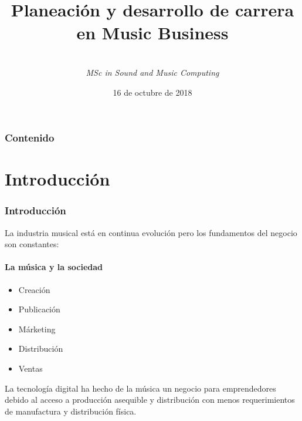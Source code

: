 \documentclass[xcolor=table]{beamer}
\title[Planeación y desarrollo de carrera en Music Business]{Planeación y desarrollo de carrera en Music Business} %
\author%
{%
    \sc{Paulo Chiliguano}\\
    \textit{MSc in Sound and Music Computing}
}
\institute%
{%
    \textit{Queen Mary University of London}
}
\date[Octubre 2018]{16 de octubre de 2018} %
\begin{document}
	\begin{frame}[plain]
		\titlepage
	\end{frame}
	\begin{frame}
		\frametitle{Contenido}
    		\tableofcontents
	\end{frame}
	\section{Introducción}
	\begin{frame}
		\frametitle{Introducción}
		La industria musical está en continua evolución pero los fundamentos del negocio son constantes:
		\framesubtitle{La música y la sociedad}
		\begin{itemize}
			\item Creación
			\item Publicación
			\item Márketing
			\item Distribución
			\item Ventas
		\end{itemize}
		La tecnología digital ha hecho de la música un negocio para emprendedores debido al acceso a producción asequible y distribución con menos requerimientos de manufactura y distribución física.
	\end{frame}
\end{document}
